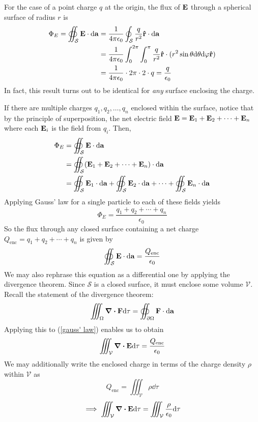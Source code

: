 For the case of a point charge $q$ at the origin, the flux of $\mathbf{E}$ through a spherical surface of radius $r$ is 
\begin{align*}
    \Phi_E = \oiint_\mathcal{S} \mathbf{E} \cdot \dd \mathbf{a} &= \frac{1}{4\pi \epsilon_0}\oint_\mathcal{S}\frac{q }{r^2}\mathbf{\hat{r}} \cdot \dd \mathbf{a} \\
    &= \frac{1}{4\pi \epsilon_0} \int_0^{2\pi} \int_0^{\pi} \frac{q}{r^2}\mathbf{\hat{r}} \cdot (r^2\sin\theta \dd \theta \dd \varphi \mathbf{\hat{r}} ) \\
    &= \frac{1}{4\pi \epsilon_0} \cdot 2\pi \cdot 2 \cdot q = \frac{q}{\epsilon_0}
\end{align*}
In fact, this result turns out to be identical for \textit{any} surface enclosing the charge. 

If there are multiple charges $q_1, q_2, \dots, q_n$ enclosed within the surface, notice that by the principle of superposition, the net electric field $\mathbf{E} = \mathbf{E}_1 + \mathbf{E}_2 + \cdots + \mathbf{E}_n$ where each $\mathbf{E}_i$ is the field from $q_i$. Then,
\begin{align*}
    \Phi_E &= \oiint_\mathcal{S} \mathbf{E} \cdot \dd \mathbf{a} \\
    &= \oiint_\mathcal{S} (\mathbf{E}_1 + \mathbf{E}_2 + \cdots + \mathbf{E}_n) \cdot \dd \mathbf{a} \\
    &= \oiint_\mathcal{S} \mathbf{E}_1\cdot \dd \mathbf{a} + \oiint_\mathcal{S} \mathbf{E}_2 \cdot \dd \mathbf{a} + \cdots + \oiint_\mathcal{S} \mathbf{E}_n \cdot \dd \mathbf{a} 
\end{align*}
Applying Gauss' law for a single particle to each of these fields yields
\[ \Phi_E = \frac{q_1 + q_2 + \cdots + q_n}{\epsilon_0} \]
So the flux through any closed surface containing a net charge $Q_\text{enc} = q_1 + q_2 + \cdots + q_n$ is given by
\begin{equation} \label{gauss' law}
    \oiint_\mathcal{S} \mathbf{E} \cdot \dd \mathbf{a} = \frac{Q_\text{enc}}{\epsilon_0}
\end{equation}
We may also rephrase this equation as a differential one by applying the divergence theorem. Since $\mathcal S$ is a closed surface, it must enclose some volume $\mathcal V$. Recall the statement of the divergence theorem:
\[ \iiint_\Omega \div \mathbf{F} \dd \tau = \oiint_{\partial\Omega} \mathbf{F} \cdot \dd \mathbf{a}\]
Applying this to (\ref{gauss' law}) enables us to obtain
\[ \iiint_{\mathcal V} \div \mathbf{E} \dd \tau = \frac{Q_\text{enc}}{\epsilon_0} \]
We may additionally write the enclosed charge in terms of the charge density $\rho$ within $\mathcal V$ as
\[ Q_\text{enc} = \iiint_\mathcal{V} \rho \dd \tau\]
\[ \implies \iiint_\mathcal{V} \div\mathbf{E} \dd \tau = \iiint_\mathcal{V} \frac{\rho}{\epsilon_0}\dd \tau\]
